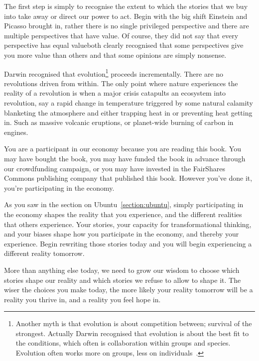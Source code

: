 The first step is simply to recognise the extent to which the stories that we buy into take away or direct our power to act. Begin with the big shift Einstein and Picasso brought in, rather there is no single privileged perspective and there are multiple perspectives that have value. Of course, they did not say that every perspective has equal value\textemdash both clearly recognised that some perspectives give you more value than others and that some opinions are simply nonsense.


Darwin  recognised that evolution\footnote{Another myth is that evolution is about competition between; survival of the strongest. Actually Darwin recognised that evolution is about the best fit to the conditions, which often is collaboration within groups and species. Evolution  often works more on groups, less on individuals~\cite{wilson-this-view-of-life}. } proceeds incrementally. There are no revolutions driven from within. The only point where nature experiences the reality of a revolution is when a major crisis catapults an ecosystem into revolution, say a rapid change in temperature triggered by some natural calamity blanketing the atmosphere and either trapping heat in or preventing heat getting in. Such as massive volcanic eruptions, or planet-wide burning of carbon in engines.


You are a participant in our economy because you are reading this book. You may have bought the book, you may have funded the book in advance through our crowdfunding campaign, or you may have invested in the FairShares Commons  publishing company that published this book. However you've done it, you're participating in the economy.


As you saw in the section on Ubuntu~\ref{section:ubuntu},  simply participating in the economy shapes the reality that you experience, and the different realities that others experience. Your stories, your capacity for transformational thinking, and your biases shape how you participate in the economy, and thereby your experience. Begin rewriting those stories today and you will begin experiencing a different reality tomorrow.


More than anything else today, we need to grow our wisdom to choose which stories shape our reality and which stories we refuse to allow to shape it. The wiser the choices you make today, the more likely your reality tomorrow will be a reality you thrive in, and a reality you feel hope in.


